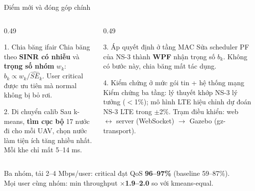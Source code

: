 \documentclass[aspectratio=169,10pt,t]{beamer}
\newcommand{\good}[1]{\textcolor{Good}{\textbf{#1}}}
\newcommand{\hl}[1]{\textcolor{MainBlue}{\textbf{#1}}}
\newcommand{\SE}{\widehat{SE}}
\begin{document}
\begin{frame}{Điểm mới và đóng góp chính}
\begin{columns}[T,onlytextwidth]
\begin{column}{0.49\textwidth}
\vspace{0pt}
  \begin{minipage}[t][1.65cm][t]{\linewidth}
  \begin{block}{1. Chia băng ifair}
    \small Chia băng theo \hl{SINR có nhiễu} và \hl{trọng số nhóm} $w_k$: $b_k \propto w_k/\SE_k$. User critical được ưu tiên mà normal không bị bỏ rơi.
  \end{block}
  \end{minipage}

  \begin{block}{2. Di chuyển calib}
    \small Sau k-means, \hl{tìm cục bộ} 17 nước đi cho mỗi UAV, chọn nước làm tiện ích tăng nhiều nhất. Mỗi khe chỉ mất 5--14 ms.
  \end{block}
\end{column}
\begin{column}{0.49\textwidth}
\vspace{0pt}
  \begin{minipage}[t][1.65cm][t]{\linewidth}
  \begin{block}{3. Áp quyết định ở tầng MAC}
    \small Sửa scheduler PF của NS-3 thành \hl{WPF} nhận trọng số $b_k$. Không có bước này, chia băng mất tác dụng.
  \end{block}
  \end{minipage}

  \begin{block}{4. Kiểm chứng ở mức gói tin + hệ thống mạng}
    \small Kiểm chứng ba tầng: lý thuyết khớp NS-3 lý tưởng ($<$1\%); mô hình LTE hiệu chỉnh dự đoán NS-3 LTE trong $\pm$2\%. Trạm điều khiển: web $\leftrightarrow$ server (WebSocket) $\rightarrow$ Gazebo (gz-transport).
  \end{block}
\end{column}
\end{columns}

\vspace{2mm}
\centering\footnotesize Ba nhóm, tải 2--4 Mbps/user: critical đạt QoS \good{96--97\%} (baseline 59--87\%).\\
Mọi user cùng nhóm: min throughput \good{$\times$1.9--2.0} so với kmeans-equal.
\end{frame}
\end{document}
